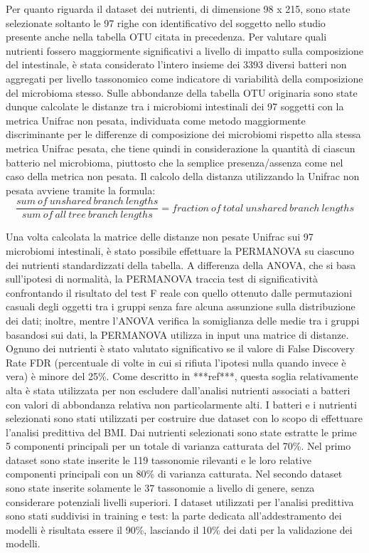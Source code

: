 Per quanto riguarda il dataset dei nutrienti, di dimensione 98 x 215, sono state selezionate soltanto le 97 righe con identificativo del soggetto nello studio presente anche nella tabella OTU citata in precedenza. 
Per valutare quali nutrienti fossero maggiormente significativi a livello di impatto sulla composizione del  intestinale, è stata considerato l’intero insieme dei 3393 diversi batteri non aggregati per livello tassonomico come indicatore di variabilità della composizione del microbioma stesso. Sulle abbondanze della tabella OTU originaria sono state dunque calcolate le distanze tra i microbiomi intestinali dei 97 soggetti con la metrica Unifrac \cite{unifrac} non pesata, individuata come metodo maggiormente discriminante per le differenze di composizione dei microbiomi rispetto alla stessa metrica Unifrac pesata, che tiene quindi in considerazione la quantità di ciascun batterio nel microbioma, piuttosto che la semplice presenza/assenza come nel caso della metrica non pesata. Il calcolo della distanza utilizzando la Unifrac non pesata avviene tramite la formula: 
$$\frac{sum\: of \:unshared \:branch\: lengths}{sum\: of\: all\: tree\: branch\: lengths} = fraction\: of\: total \:unshared \:branch \:lengths$$

Una volta calcolata la matrice delle distanze non pesate Unifrac sui 97 microbiomi intestinali, è stato possibile effettuare la PERMANOVA\cite{permanova} su ciascuno dei nutrienti standardizzati della tabella. A differenza della ANOVA, che si basa sull’ipotesi di normalità, la PERMANOVA traccia test di significatività confrontando il risultato del test F reale con quello ottenuto dalle permutazioni casuali degli oggetti tra i gruppi senza fare alcuna assunzione sulla distribuzione dei dati; inoltre, mentre l'ANOVA verifica la somiglianza delle medie tra i gruppi basandosi sui dati, la PERMANOVA utilizza in input una matrice di distanze. Ognuno dei nutrienti è stato valutato significativo se il valore di False Discovery Rate FDR (percentuale di volte in cui si rifiuta l’ipotesi nulla quando invece è vera) è minore del 25\%. Come descritto in ***ref***, questa soglia relativamente alta è stata utilizzata per non escludere dall’analisi nutrienti associati a batteri con valori di abbondanza relativa non particolarmente alti.
I batteri e i nutrienti selezionati sono stati utilizzati per costruire due dataset con lo scopo di effettuare l’analisi predittiva del BMI. Dai nutrienti selezionati sono state estratte le prime 5 componenti principali per un totale di varianza catturata del 70\%. Nel primo dataset sono state inserite le 119 tassonomie rilevanti e le loro relative componenti principali con un 80\% di varianza catturata. Nel secondo dataset sono state inserite solamente le 37 tassonomie a livello di genere, senza considerare potenziali livelli superiori. I dataset utilizzati per l’analisi predittiva sono stati suddivisi in training e test: la parte dedicata all’addestramento dei modelli è risultata essere il 90\%, lasciando il 10\% dei dati per la validazione dei modelli.


